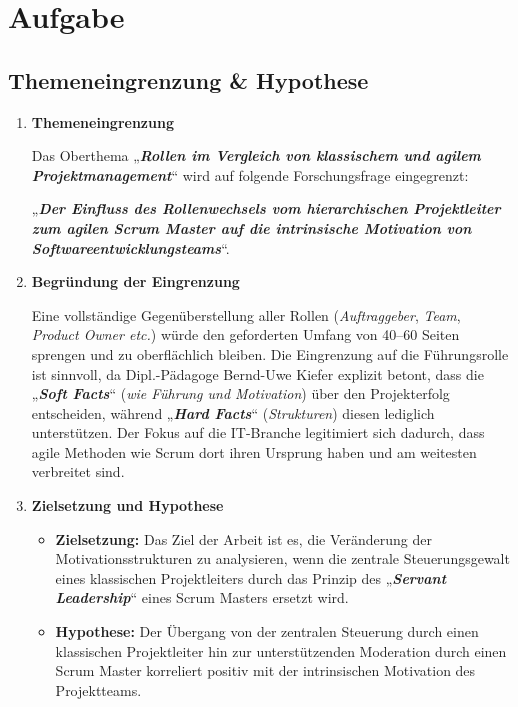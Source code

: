 
\chapter{Aufgabe}
\label{chap:2 Aufgabe}
\thispagestyle{fancy}
\section{Themeneingrenzung \& Hypothese}
\begin{enumerate}[label=\thechapter.\arabic*), leftmargin=*]
    \item \textbf{Themeneingrenzung} \par Das Oberthema „\textbf{\textit{Rollen im Vergleich von klassischem und agilem Projektmanagement}}“ wird auf folgende Forschungsfrage eingegrenzt: \par „\textbf{\textit{Der Einfluss des Rollenwechsels vom hierarchischen Projektleiter zum agilen Scrum Master auf die intrinsische Motivation von Softwareentwicklungsteams}}“.
    \item \textbf{Begründung der Eingrenzung} \par Eine vollständige Gegenüberstellung aller Rollen (\textit{Auftraggeber}, \textit{Team}, \textit{Product Owner \acs{etc.}}) würde den geforderten Umfang von 40–60 Seiten sprengen und zu oberflächlich bleiben. Die Eingrenzung auf die Führungsrolle ist sinnvoll, da Dipl.-Pädagoge Bernd-Uwe Kiefer \cite[1]{1} explizit betont, dass die „\textbf{\textit{Soft Facts}}“ (\textit{wie Führung und Motivation}) über den Projekterfolg entscheiden, während „\textbf{\textit{Hard Facts}}“ (\textit{Strukturen}) diesen lediglich unterstützen. Der Fokus auf die \acs{IT}-Branche legitimiert sich dadurch, dass agile Methoden wie Scrum dort ihren Ursprung haben und am weitesten verbreitet sind.
    \item \textbf{Zielsetzung und Hypothese} 
    \begin{itemize}
        \item \textbf{Zielsetzung:} Das Ziel der Arbeit ist es, die Veränderung der Motivationsstrukturen zu analysieren, wenn die zentrale Steuerungsgewalt eines klassischen Projektleiters durch das Prinzip des „\textbf{\textit{Servant Leadership}}“ eines Scrum Masters ersetzt wird.
        \item \textbf{Hypothese:} Der Übergang von der zentralen Steuerung durch einen klassischen Projektleiter hin zur unterstützenden Moderation durch einen Scrum Master korreliert positiv mit der intrinsischen Motivation des Projektteams.

\end{itemize}
\end{enumerate}
